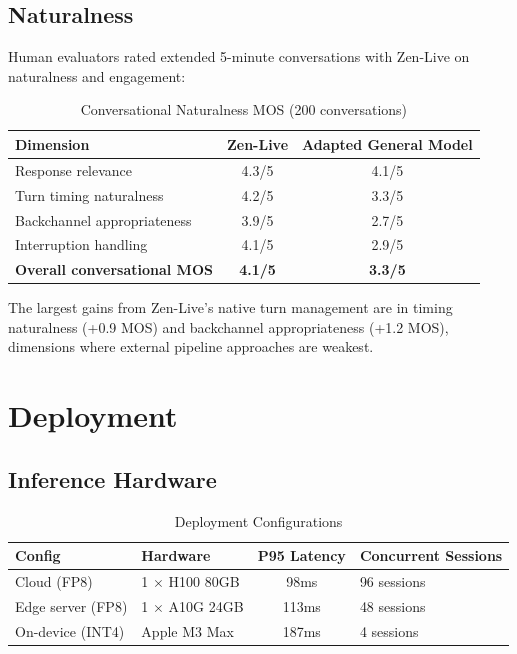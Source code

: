 \documentclass[11pt,a4paper]{article}
\begin{document}
\subsection{Naturalness}

Human evaluators rated extended 5-minute conversations with Zen-Live on naturalness and engagement:

\begin{table}[H]
\centering
\caption{Conversational Naturalness MOS (200 conversations)}
\begin{tabular}{lcc}
\toprule
\textbf{Dimension} & \textbf{Zen-Live} & \textbf{Adapted General Model} \\
\midrule
Response relevance & 4.3/5 & 4.1/5 \\
Turn timing naturalness & 4.2/5 & 3.3/5 \\
Backchannel appropriateness & 3.9/5 & 2.7/5 \\
Interruption handling & 4.1/5 & 2.9/5 \\
\textbf{Overall conversational MOS} & \textbf{4.1/5} & \textbf{3.3/5} \\
\bottomrule
\end{tabular}
\end{table}

The largest gains from Zen-Live's native turn management are in timing naturalness (+0.9 MOS) and backchannel appropriateness (+1.2 MOS), dimensions where external pipeline approaches are weakest.

\section{Deployment}

\subsection{Inference Hardware}

\begin{table}[H]
\centering
\caption{Deployment Configurations}
\label{tab:zenlive-deploy}
\begin{tabular}{llcl}
\toprule
\textbf{Config} & \textbf{Hardware} & \textbf{P95 Latency} & \textbf{Concurrent Sessions} \\
\midrule
Cloud (FP8) & 1 $\times$ H100 80GB & 98ms & 96 sessions \\
Edge server (FP8) & 1 $\times$ A10G 24GB & 113ms & 48 sessions \\
On-device (INT4) & Apple M3 Max & 187ms & 4 sessions \\
\bottomrule
\end{tabular}
\end{table}
\end{document}
